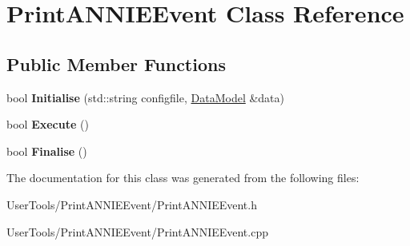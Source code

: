\hypertarget{classPrintANNIEEvent}{
\section{PrintANNIEEvent Class Reference}
\label{classPrintANNIEEvent}
}
\subsection*{Public Member Functions}
\begin{DoxyCompactItemize}
\item 
\hypertarget{classPrintANNIEEvent_a837c3af8455ac4ad69218de09e1a9904}{
bool {\bfseries Initialise} (std::string configfile, \hyperlink{classDataModel}{DataModel} \&data)}
\label{classPrintANNIEEvent_a837c3af8455ac4ad69218de09e1a9904}

\item 
\hypertarget{classPrintANNIEEvent_aebc14f16147292bfe4c9dcd0b433bee2}{
bool {\bfseries Execute} ()}
\label{classPrintANNIEEvent_aebc14f16147292bfe4c9dcd0b433bee2}

\item 
\hypertarget{classPrintANNIEEvent_a164df9cb5bd54feadb715dd0a73eb9d3}{
bool {\bfseries Finalise} ()}
\label{classPrintANNIEEvent_a164df9cb5bd54feadb715dd0a73eb9d3}

\end{DoxyCompactItemize}


The documentation for this class was generated from the following files:\begin{DoxyCompactItemize}
\item 
UserTools/PrintANNIEEvent/PrintANNIEEvent.h\item 
UserTools/PrintANNIEEvent/PrintANNIEEvent.cpp\end{DoxyCompactItemize}
